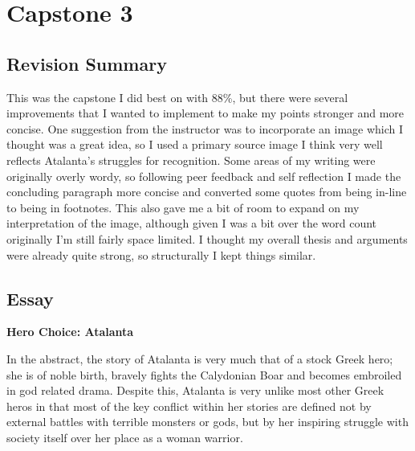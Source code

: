 \documentclass[letterpaper, reqno,11pt]{article}
\begin{document}
\pagebreak

\section*{Capstone 3}

\subsection*{Revision Summary}

This was the capstone I did best on with 88\%, but there were several improvements that I wanted to implement to make my points stronger and more concise. One suggestion from the instructor was to incorporate an image which I thought was a great idea, so I used a primary source image I think very well reflects Atalanta's struggles for recognition. Some areas of my writing were originally overly wordy, so following peer feedback and self reflection I made the concluding paragraph more concise and converted some quotes from being in-line to being in footnotes. This also gave me a bit of room to expand on my interpretation of the image, although given I was a bit over the word count originally I'm still fairly space limited. I thought my overall thesis and arguments were already quite strong, so structurally I kept things similar.

\subsection*{Essay}

{\noindent\bf Hero Choice: Atalanta}

In the abstract, the story of Atalanta is very much that of a stock Greek hero; she is of noble birth, bravely fights the Calydonian Boar and becomes embroiled in god related drama. Despite this, Atalanta is very unlike most other Greek heros in that most of the key conflict within her stories are defined not by external battles with terrible monsters or gods, but by her inspiring struggle with society itself over her place as a woman warrior.

\medskip
\end{document}
